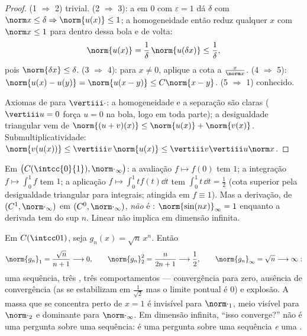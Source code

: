 \begin{proof}
(1 $\Rightarrow$ 2) trivial. (2 $\Rightarrow$ 3): a  em $0$
com $\varepsilon = 1$ dá $\delta$ com $\norm x \leq \delta
\Rightarrow \norm{u(x)} \leq 1$; a homogeneidade então reduz qualquer $x$
com $\norm x \leq 1$ para dentro dessa bola e de volta:
\[
\norm{u(x)} = \frac1\delta\,\norm{u(\delta x)} \leq
\frac1\delta ,
\]
pois $\norm{\delta x} \leq \delta$. (3 $\Rightarrow$ 4):
para $x \neq 0$, aplique a cota a $\frac{x}{\norm x}$. (4
$\Rightarrow$ 5): $\norm{u(x) - u(y)} = \norm{u(x - y)} \leq
C\norm{x - y}$. (5 $\Rightarrow$ 1) conhecido.

Axiomas de  para $\vertiii\cdot$: a homogeneidade e a separação são
claras ($\vertiii u = 0$ força $u = 0$ na bola, logo
em toda parte); a desigualdade triangular vem de $\norm{(u + v)(x)} \leq
\norm{u(x)} + \norm{v(x)}$. Submultiplicatividade: $\norm{v(u(x))}
\leq \vertiii v\,\norm{u(x)} \leq \vertiii v \vertiii u \norm x$.
\end{proof}

\begin{example}\label{ex:b2:nvs:operatornorms}
Em $\bigl(C(\intcc{0}{1}), \norm\cdot_\infty\bigr)$: a avaliação
$f \mapsto f(0)$ tem  $1$; a integração $f \mapsto
\int_0^1 f$ tem  $1$; a aplicação $f \mapsto \int_0^1 t f(t)\dd t$
tem  $\int_0^1 t\,\dd t = \frac12$ (cota superior pela desigualdade
triangular para integrais; atingida em $f \equiv 1$). Mas
a derivação, de $(C^1, \norm\cdot_\infty)$ em $(C^0,
\norm\cdot_\infty)$, \emph{não} é : $\norm{\sin(nx)}_\infty
= 1$ enquanto a derivada tem  do sup $n$. Linear não implica
 em dimensão infinita.
\end{example}

\begin{example}\label{ex:b2:nvs:sqrtnxn}
Em $C(\intcc01)$, seja $g_n(x) = \sqrt{n}\,x^n$. Então
\[
\norm{g_n}_1 = \frac{\sqrt n}{n + 1} \longrightarrow 0,
\qquad
\norm{g_n}_2^2 = \frac{n}{2n + 1} \longrightarrow \frac12,
\qquad
\norm{g_n}_\infty = \sqrt n \longrightarrow \infty :
\]
uma sequência, três , três comportamentos --- convergência para
zero, ausência de convergência (as  se estabilizam em $\frac1{\sqrt2}$ mas
o limite pontual é $0$) e explosão. A massa que se concentra
perto de $x = 1$ é invisível para $\norm\cdot_1$, meio visível para
$\norm\cdot_2$ e dominante para $\norm\cdot_\infty$. Em dimensão
infinita, ``isso converge?'' não é uma pergunta sobre uma
sequência: é uma pergunta sobre uma sequência \emph{e} uma .
\end{example}

